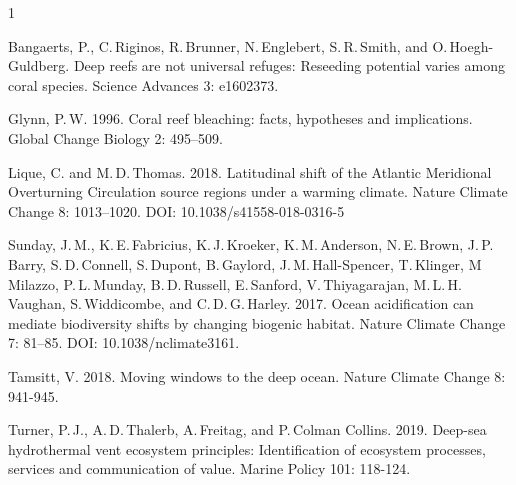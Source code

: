 \documentclass[12pt, addpoints]{exam}
\begin{document}
\begin{hangparas}{\leftmargin}{1}




Bangaerts, P., C.\,Riginos, R.\,Brunner, N.\,Englebert, 
S.\,R.\,Smith, and O.\,Hoegh-Guldberg. Deep reefs are not 
universal refuges: Reseeding potential varies among coral species.
Science Advances 3: e1602373.

Glynn, P.\,W. 1996. Coral reef bleaching: facts, hypotheses and 
implications. Global Change Biology 2: 495–509.

Lique, C. and M.\,D.\,Thomas. 2018. Latitudinal shift of the Atlantic Meridional Overturning Circulation source regions under a warming climate. Nature Climate Change 8: 1013–1020. DOI: 10.1038/s41558-018-0316-5

Sunday, J.\,M., K.\,E.\,Fabricius, K.\,J.\,Kroeker, K.\,M.\,Anderson, N.\,E.\,Brown, J.\,P.\,Barry, S.\,D.\,Connell, S.\,Dupont, B.\,Gaylord,
J.\,M.\,Hall-Spencer, T.\,Klinger, M\,Milazzo, P.\,L.\,Munday, B.\,D.\,Russell, E.\,Sanford, V.\,Thiyagarajan, M.\,L.\,H.\,Vaughan, S.\,Widdicombe, and C.\,D.\,G.\,Harley. 2017. Ocean acidification can mediate biodiversity
shifts by changing biogenic habitat. Nature Climate Change 7: 81–85. DOI: 10.1038/nclimate3161.

Tamsitt, V. 2018. Moving windows to the deep ocean. Nature Climate Change 8: 941-945. 

Turner, P.\,J., A.\,D.\,Thalerb, A.\,Freitag, and P.\,Colman Collins. 2019. Deep-sea hydrothermal vent ecosystem principles: Identification of ecosystem processes, services and communication of value. Marine Policy 101: 118-124.

\end{hangparas}
\end{document}
